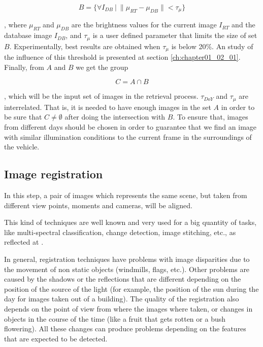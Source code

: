 \begin{equation}\label{eq:cp01_eligible_images_by_brightness}
B = \{ \forall I_{DB} ~|~ \| \mu_{RT} - \mu_{DB} \| < \tau_{\mu} \}
\end{equation}

, where $\mu_{RT}$ and $\mu_{DB}$ are the brightness values for the current image $I_{RT}$ and the database image $I_{DB}$, and $\tau_{\mu}$ is a user defined parameter that limits the size of set $B$. Experimentally, best results are obtained when $\tau_{\mu}$ is below 20\%. An study of the influence of this threshold is presented at section \ref{ch:chapter01_02_01}. Finally, from $A$ and $B$ we get the group

\begin{equation}\label{eq:cp01_eligible_images}
C = A \cap B
\end{equation}

, which will be the input set of images in the retrieval process. $\tau_{DoY}$ and $\tau_{\mu}$ are interrelated. That is, it is needed to have enough images in the set $A$ in order to be sure that $C \neq \emptyset$ after doing the intersection with $B$. To ensure that, images from different days should be chosen in order to guarantee that we find an image with similar illumination conditions to the current frame in the surroundings of the vehicle.

\subsection{Image registration}\label{ch:chapter01_01_02}

In this step, a pair of images which represents the same scene, but taken from different view points, moments and cameras, will be aligned.

This kind of techniques are well known and very used for a big quantity of tasks, like multi-spectral classification, change detection, image stitching, etc., as reflected at \cite{kooper2011stitching, singh1996digital, coppin1996digital, radke2005image, zitova2003image}.

In general, registration techniques have problems with image disparities due to the movement of non static objects (windmills, flags, etc.). Other problems are caused by the shadows or the reflections that are different depending on the position of the source of the light (for example, the position of the sun during the day for images taken out of a building). The quality of the registration also depends on the point of view from where the images where taken, or changes in objects in the course of the time (like a fruit that gets rotten or a bush flowering). All these changes can produce problems depending on the features that are expected to be detected.

